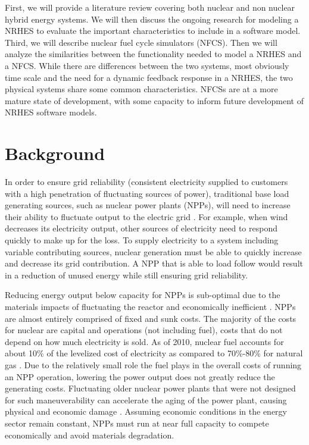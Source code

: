 \documentclass{article}                                                                           %
\begin{document}
\begin{linenumbers}
First, we will provide a literature review covering both nuclear and non nuclear hybrid energy systems.  We will then discuss the ongoing research for modeling a NRHES to evaluate the important characteristics to include in a software model. Third, we will describe nuclear fuel cycle simulators (NFCS). Then we will analyze the similarities between the functionality needed to model a NRHES and a NFCS. While there are differences between the two systems, most obviously time scale and the need for a dynamic feedback response in a NRHES, the two physical systems share some common characteristics. NFCSs are at a more mature state of development, with some capacity to inform future development of NRHES software models.

\section{Background}
In order to ensure grid reliability (consistent electricity supplied to customers with a high penetration of fluctuating sources of power), traditional base load generating sources, such as nuclear power plants (NPPs), will need to increase their ability to fluctuate output to the electric grid \cite {Denholm2011}. For example, when wind decreases its electricity output, other sources of electricity need to respond quickly to make up for the loss. To supply electricity to a system including variable contributing sources, nuclear generation must be able to quickly increase and decrease its grid contribution. A NPP that is able to load follow would result in a reduction of unused energy while still ensuring grid reliability.

Reducing energy output below capacity for NPPs is sub-optimal due to the materials impacts of fluctuating the reactor and economically inefficient \cite{Nuclear2011}. NPPs are almost entirely comprised of fixed and sunk costs. The majority of the costs for nuclear are capital and operations (not including fuel), costs that do not depend on how much electricity is sold. As of 2010, nuclear fuel accounts for about 10\% of the levelized cost of electricity as compared to 70\%-80\% for natural gas \cite{IEA/NEA}. Due to the relatively small role the fuel plays in the overall costs of running an NPP operation, lowering the power output does not greatly reduce the generating costs. Fluctuating older nuclear power plants that were not designed for such maneuverability can accelerate the aging of the power plant, causing physical and economic damage \cite{Nuclear2011}. Assuming economic conditions in the energy sector remain constant, NPPs must run at near full capacity to compete economically and avoid materials degradation.


\end{linenumbers}
\end{document}
